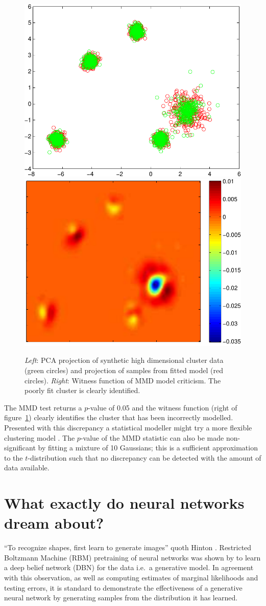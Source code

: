 \documentclass{article} %
\def\ie{i.e.\ }
\begin{document}
\begin{figure}[ht]
\centering
\includegraphics[width=0.3\columnwidth]{figures/high_mog_pca}
\hspace{0.1\columnwidth}
\includegraphics[width=0.31\columnwidth]{figures/high_mog_witness}
\caption{
\emph{Left}: PCA projection of synthetic high dimensional cluster data (green circles) and projection of samples from fitted model (red circles).
\emph{Right}: Witness function of MMD model criticism.
The poorly fit cluster is clearly identified.
}
\label{fig:high_mog}
\end{figure}

The MMD test returns a $p$-value of 0.05 and the witness function (right of figure~\ref{fig:high_mog}) clearly identifies the cluster that has been incorrectly modelled.
Presented with this discrepancy a statistical modeller might try a more flexible clustering model \citep[e.g.][]{Peel2000-pv, Iwata2013-yj}.
The $p$-value of the MMD statistic can also be made non-significant by fitting a mixture of 10 Gaussians; this is a sufficient approximation to the $t$-distribution such that no discrepancy can be detected with the amount of data available.

\section{What exactly do neural networks dream about?}

``To recognize shapes, first learn to generate images'' quoth Hinton \citep{Hinton2007-eo}.
Restricted Boltzmann Machine (RBM) pretraining of neural networks was shown by \cite{Hinton2006-yw} to learn a deep belief network (DBN) for the data \ie a generative model.
In agreement with this observation, as well as computing estimates of marginal likelihoods and testing errors, it is standard to demonstrate the effectiveness of a generative neural network by generating samples from the distribution it has learned.
\end{document}
